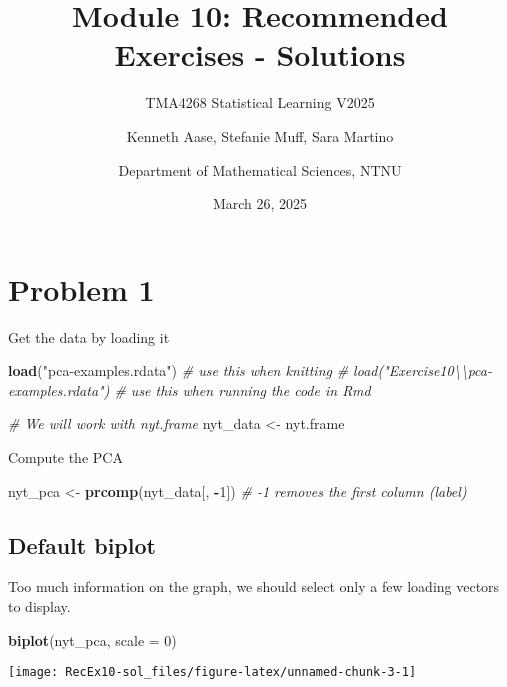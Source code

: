 \documentclass[
]{article}
\title{Module 10: Recommended Exercises - Solutions}
\subtitle{TMA4268 Statistical Learning V2025}
\author{Kenneth Aase, Stefanie Muff, Sara Martino \and Department of
Mathematical Sciences, NTNU}
\date{March 26, 2025}
\newenvironment{Shaded}{\begin{snugshade}}{\end{snugshade}}
\newcommand{\AttributeTok}[1]{\textcolor[rgb]{0.13,0.29,0.53}{#1}}
\newcommand{\CommentTok}[1]{\textcolor[rgb]{0.56,0.35,0.01}{\textit{#1}}}
\newcommand{\DecValTok}[1]{\textcolor[rgb]{0.00,0.00,0.81}{#1}}
\newcommand{\FunctionTok}[1]{\textcolor[rgb]{0.13,0.29,0.53}{\textbf{#1}}}
\newcommand{\NormalTok}[1]{#1}
\newcommand{\OtherTok}[1]{\textcolor[rgb]{0.56,0.35,0.01}{#1}}
\newcommand{\SpecialCharTok}[1]{\textcolor[rgb]{0.81,0.36,0.00}{\textbf{#1}}}
\newcommand{\StringTok}[1]{\textcolor[rgb]{0.31,0.60,0.02}{#1}}
\begin{document}
\maketitle

\section{Problem 1}\label{problem-1}

Get the data by loading it

\begin{Shaded}
\begin{Highlighting}[]
\FunctionTok{load}\NormalTok{(}\StringTok{"pca{-}examples.rdata"}\NormalTok{)  }\CommentTok{\# use this when knitting}
\CommentTok{\# load("Exercise10\textbackslash{}\textbackslash{}pca{-}examples.rdata")  \# use this when running the code in Rmd}

\CommentTok{\# We will work with nyt.frame}
\NormalTok{nyt\_data }\OtherTok{\textless{}{-}}\NormalTok{ nyt.frame}
\end{Highlighting}
\end{Shaded}

Compute the PCA

\begin{Shaded}
\begin{Highlighting}[]
\NormalTok{nyt\_pca }\OtherTok{\textless{}{-}} \FunctionTok{prcomp}\NormalTok{(nyt\_data[, }\SpecialCharTok{{-}}\DecValTok{1}\NormalTok{])  }\CommentTok{\# {-}1 removes the first column (label)}
\end{Highlighting}
\end{Shaded}

\subsection{Default biplot}\label{default-biplot}

Too much information on the graph, we should select only a few loading
vectors to display.

\begin{Shaded}
\begin{Highlighting}[]
\FunctionTok{biplot}\NormalTok{(nyt\_pca, }\AttributeTok{scale =} \DecValTok{0}\NormalTok{)}
\end{Highlighting}
\end{Shaded}

\begin{center}\texttt{[image: RecEx10-sol\_files/figure-latex/unnamed-chunk-3-1]} \end{center}
\end{document}
